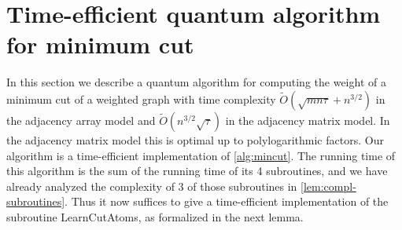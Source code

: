 \documentclass[10pt,a4paper]{article}
\newcommand{\tO}{\tilde O}
\newcommand{\1}{\mathbf{1}}
\theoremstyle{definition}
\begin{document}

\section{Time-efficient quantum algorithm for minimum cut} \label{sec:time-efficient}
In this section we describe a quantum algorithm for computing the weight of a minimum cut of a weighted graph with time complexity $\tO(\sqrt{mn\tau} + n^{3/2})$ in the adjacency array model and $\tO(n^{3/2}\sqrt{\tau})$ in the adjacency matrix model.
In the adjacency matrix model this is optimal up to polylogarithmic factors.
Our algorithm is a time-efficient implementation of \cref{alg:mincut}.  The running time of this algorithm is the sum of the running time of its 4 subroutines, and we have already 
analyzed the complexity of 3 of those subroutines in \cref{lem:compl-subroutines}.  Thus it now suffices to give a time-efficient implementation of the subroutine 
LearnCutAtoms, as formalized in the next lemma.
\end{document}
